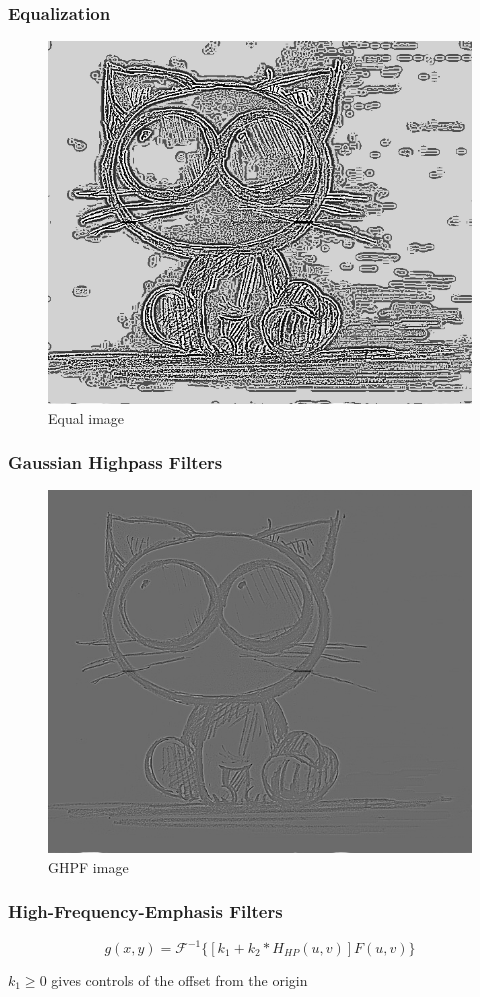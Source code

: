 \documentclass[notheorems, serif, table, compress]{beamer}  %
\begin{document}
\begin{frame}
\frametitle{Equalization}
\begin{figure}
 \centering
 \caption{Equal image}
 \includegraphics[width=0.8\linewidth]{equa1.png} 
 \end{figure}
 \end{frame}

\begin{frame}
\frametitle{Gaussian Highpass Filters}
\begin{figure}
 \centering
 \caption{GHPF image}
 \includegraphics[width=0.8\linewidth]{ghpf.png} 
 \end{figure}
 \end{frame}

\begin{frame}
\frametitle{High-Frequency-Emphasis Filters}%
\begin{equation} \label{12}
g(x,y)=\mathscr{F}^{-1}\{[k_{1}+k_{2}*H_{HP}(u,v)]F(u,v)\}
\end{equation}

 \qquad   $k_{1}\geq 0$ gives controls of the offset from the origin
\end{frame}
\end{document}
